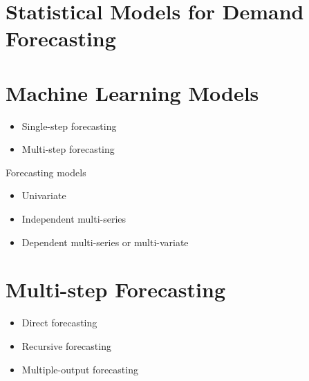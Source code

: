 

\section{Statistical Models for Demand Forecasting}
\label{sec:statistical_models}



\section{Machine Learning Models}
\label{sec:machine_learning_models}

\begin{itemize}
    \item Single-step forecasting
    \item Multi-step forecasting
\end{itemize}

Forecasting models
\begin{itemize}
    \item Univariate
    \item Independent multi-series
    \item Dependent multi-series or multi-variate
\end{itemize}


\section{Multi-step Forecasting}
\label{sec:multi_step_forecasting}
%
\begin{itemize}
    \item Direct forecasting
    \item Recursive forecasting
    \item Multiple-output forecasting
\end{itemize}






